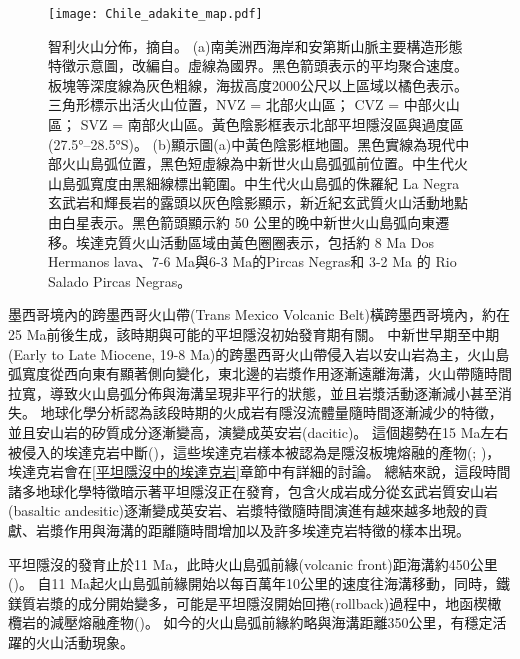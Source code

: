 \begin{figure*}[ht!]
    \centering
    \texttt{[image: Chile\_adakite\_map.pdf]}
    \caption[智利火山分佈，摘自\citealp{goss2009extreme}。]{智利火山分佈，摘自\citealp{goss2009extreme}。
    (a)南美洲西海岸和安第斯山脈主要構造形態特徵示意圖，改編自\citealp{lamb2003cenozoic}。虛線為國界。黑色箭頭表示\citealp{demets1990current}的平均聚合速度。板塊等深度線為灰色粗線，海拔高度2000公尺以上區域以橘色表示。三角形標示出活火山位置，NVZ = 北部火山區； CVZ = 中部火山區； SVZ = 南部火山區。黃色陰影框表示北部平坦隱沒區與過度區(27.5°–28.5°S)。
    (b)顯示圖(a)中黃色陰影框地圖。黑色實線為現代中部火山島弧位置，黑色短虛線為中新世火山島弧弧前位置。中生代火山島弧寬度由黑細線標出範圍。中生代火山島弧的侏羅紀 La Negra 玄武岩和輝長岩的露頭以灰色陰影顯示，新近紀玄武質火山活動地點由白星表示。黑色箭頭顯示約 50 公里的晚中新世火山島弧向東遷移。埃達克質火山活動區域由黃色圈圈表示，包括約 8 Ma Dos Hermanos lava、7-6 Ma與6-3 Ma的Pircas Negras和 3-2 Ma 的 Rio Salado Pircas Negras。
    }
    \label{fig::Chile_adakite_map}
\end{figure*}


墨西哥境內的跨墨西哥火山帶(Trans Mexico Volcanic Belt)橫跨墨西哥境內，約在25 Ma前後生成，該時期與可能的平坦隱沒初始發育期有關。
中新世早期至中期(Early to Late Miocene, 19-8 Ma)的跨墨西哥火山帶侵入岩以安山岩為主，火山島弧寬度從西向東有顯著側向變化，東北邊的岩漿作用逐漸遠離海溝，火山帶隨時間拉寬，導致火山島弧分佈與海溝呈現非平行的狀態，並且岩漿活動逐漸減小甚至消失。
地球化學分析認為該段時期的火成岩有隱沒流體量隨時間逐漸減少的特徵，並且安山岩的矽質成分逐漸變高，演變成英安岩(dacitic)。
這個趨勢在15 Ma左右被侵入的埃達克岩中斷(\citealp{mori2007effects})，這些埃達克岩樣本被認為是隱沒板塊熔融的產物(\citealp{gomez2003temporal}; \citealp{mori2007effects})，埃達克岩會在\ref{平坦隱沒中的埃達克岩}章節中有詳細的討論。
總結來說，這段時間諸多地球化學特徵暗示著平坦隱沒正在發育，包含火成岩成分從玄武岩質安山岩(basaltic andesitic)逐漸變成英安岩、岩漿特徵隨時間演進有越來越多地殼的貢獻、岩漿作用與海溝的距離隨時間增加以及許多埃達克岩特徵的樣本出現。

平坦隱沒的發育止於11 Ma，此時火山島弧前緣(volcanic front)距海溝約450公里(\citealp{Manea2011Thermal})。
自11 Ma起火山島弧前緣開始以每百萬年10公里的速度往海溝移動，同時，鐵鎂質岩漿的成分開始變多，可能是平坦隱沒開始回捲(rollback)過程中，地函楔橄欖岩的減壓熔融產物(\citealp{gomez2003temporal})。
如今的火山島弧前緣約略與海溝距離350公里，有穩定活躍的火山活動現象。

